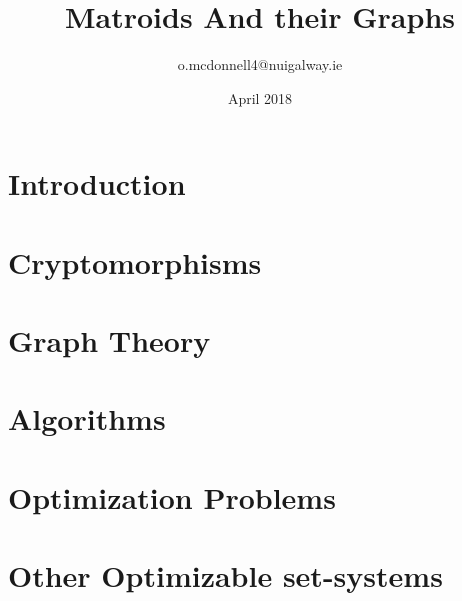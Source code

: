 \documentclass{article}
\title{Matroids And their Graphs}
\author{o.mcdonnell4@nuigalway.ie }
\date{April 2018}
\theoremstyle{plain}
\theoremstyle{definition}
\theoremstyle{remark}
\begin{document}
 
\maketitle
 


\section{Introduction}





\section{Cryptomorphisms}





\section{Graph Theory}


\section{Algorithms}




\section{Optimization Problems}




\section{Other Optimizable set-systems}

\end{document}
